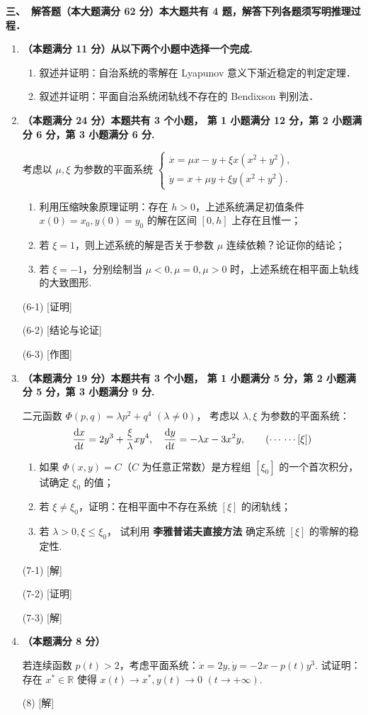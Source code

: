 \textbf{三、\ 解答题（本大题满分 62 分）本大题共有 4 题，解答下列各题须写明推理过程．}
\begin{enumerate}
\item \textbf{（本题满分 11 分）从以下两个小题中选择一个完成.}
\begin{enumerate}[label=(\arabic*)]
\item 叙述并证明：自治系统的零解在 Lyapunov 意义下渐近稳定的判定定理．
\item 叙述并证明：平面自治系统闭轨线不存在的 Bendixson 判别法．
\end{enumerate}

\item \textbf{（本题满分 24 分）本题共有 3 个小题，
第 1 小题满分 12 分，第 2 小题满分 6 分，第 3 小题满分 6 分.}

考虑以 $\mu, \xi$ 为参数的平面系统 $\left\{\begin{array}{l}\dot{x}=\mu x-y+\xi x(x^{2}+y^{2}), \\ 
    \dot{y}=x+\mu y+\xi y(x^{2}+y^{2}).\end{array}\right.$
\begin{enumerate}[label=(\arabic*)]
\item 利用压缩映象原理证明：存在 $h>0$，上述系统满足初值条件 $x(0)=x_{0}, y(0)=y_{0}$ 的解在区间 $[0, h]$ 上存在且惟一；
\item 若 $\xi=1$，则上述系统的解是否关于参数 $\mu$ 连续依赖？论证你的结论；
\item 若 $\xi=-1$，分别绘制当 $\mu<0, \mu=0, \mu>0$ 时，上述系统在相平面上轨线的大致图形.
\end{enumerate}
(6-1) [证明]

(6-2) [结论与论证]

(6-3) [作图]

\item \textbf{（本题满分 19 分）本题共有 3 个小题，
第 1 小题满分 5 分，第 2 小题满分 5 分，第 3 小题满分 9 分.}

二元函数 $\varPhi(p, q)=\lambda p^{2}+q^{4}$ $(\lambda \neq 0)$，
考虑以 $\lambda, \xi$ 为参数的平面系统：
$$\frac{{\rm d} x}{{\rm d} t}=2 y^{3}+\frac{\xi}{\lambda} x y^{4}, \quad 
\frac{{\rm d} y}{{\rm d} t}=-\lambda x-3 x^{2} y,\tag{$\cdots\,\cdots[\xi]$}$$
\begin{enumerate}[label=(\arabic*)]
\item 如果 $\varPhi(x, y)=C$（$C$ 为任意正常数）是方程组 $[\xi_{0}]$ 的一个首次积分，试确定 $\xi_{0}$ 的值；
\item 若 $\xi \neq \xi_{0}$，证明：在相平面中不存在系统 $[\xi]$ 的闭轨线；
\item 若 $\lambda>0, \xi \leqslant \xi_{0}$，
试利用 \textbf{李雅普诺夫直接方法 } 确定系统 $[\xi]$ 的零解的稳定性.
\end{enumerate}
(7-1) [解]

(7-2) [证明]

(7-3) [解]

\item \textbf{（本题满分 8 分）}

若连续函数 $p(t)>2$，考虑平面系统：$\dot{x}=2 y, \dot{y}=-2 x-p(t) y^{3}$. 
试证明：存在 $x^{*} \in \mathbb{R}$ 使得 $x(t) \rightarrow x^{*}, y(t) \rightarrow 0$ $(t \rightarrow+\infty)$.

(8) [解]
\end{enumerate}